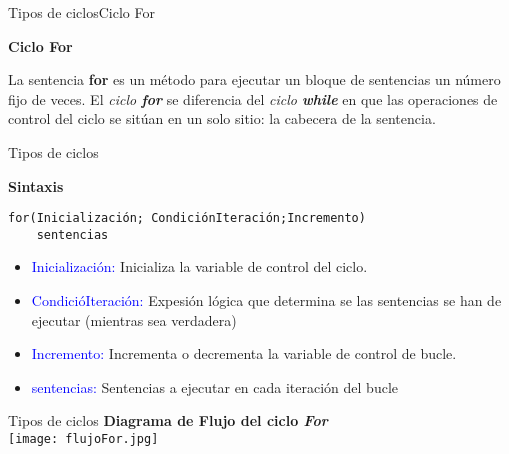 
\begin{frame}{Tipos de ciclos}{Ciclo For}
\begin{center}
    \textbf{Ciclo For}
\end{center}
La sentencia \textbf{for} es un método para ejecutar un bloque de sentencias un número fijo de veces. El \textit{ciclo \textbf{for}} se diferencia del \textit{ciclo \textbf{while}} en que las operaciones de control del ciclo se sitúan en un solo sitio: la cabecera de la sentencia.
\end{frame}

\begin{frame}[fragile, t]{Tipos de ciclos}
    \begin{center}
        \textbf{Sintaxis}
    \end{center}
    \vspace{-5mm}
    \begin{lstlisting}[basicstyle=\ttfamily\small]
for(Inicialización; CondiciónIteración;Incremento)
    sentencias
\end{lstlisting}
    \vspace{-3mm}
{\small \begin{itemize}
    \item \textcolor{blue}{Inicialización:} Inicializa la variable de control del ciclo.\pause
    \item \textcolor{blue}{CondicióIteración:} Expesión lógica que determina se las sentencias se han de ejecutar (mientras sea verdadera)\pause
    \item \textcolor{blue}{Incremento:} Incrementa o decrementa la variable de control de bucle.\pause
    \item \textcolor{blue}{sentencias:} Sentencias a ejecutar en cada iteración del bucle
\end{itemize}}
\end{frame}


\begin{frame}{Tipos de ciclos}
    \centering
    \textbf{Diagrama de Flujo del ciclo \textit{For}}\\
    \vspace{3mm}
    \texttt{[image: flujoFor.jpg]}
\end{frame}



